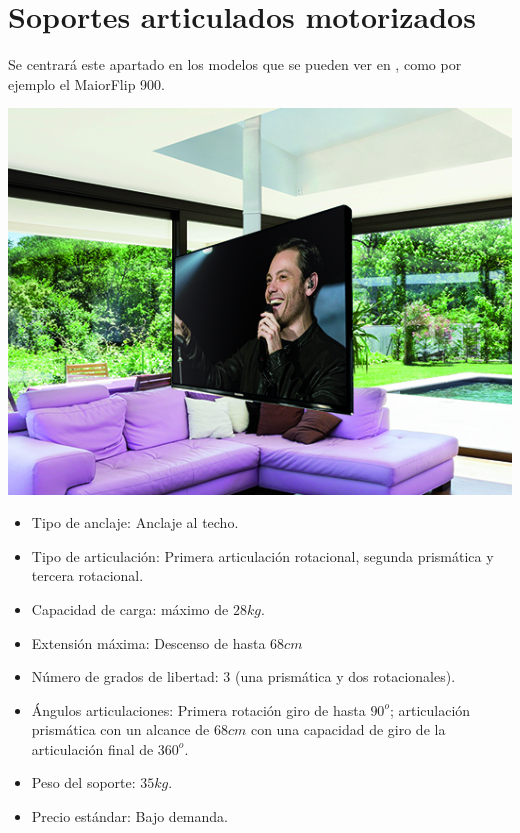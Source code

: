 \section{Soportes articulados motorizados}

Se centrará este apartado en los modelos que se pueden ver en \cite{maiormover:2018}, como por ejemplo el MaiorFlip 900.

\begin{minipage}{0.35\textwidth}
   \includegraphics[width=\linewidth]{figuras/Imagenes_EstadoArte/not_valid_1.jpg}
\end{minipage}
\begin{minipage}{0.65\textwidth}\raggedright
   \hspace{1cm}
   \begin{itemize}
       \item Tipo de anclaje: Anclaje al techo.
       \item Tipo de articulación: Primera articulación rotacional, segunda prismática y tercera rotacional.
       \item Capacidad de carga: máximo de $28kg$.
       \item Extensión máxima: Descenso de hasta $68cm$
       \item Número de grados de libertad: 3 (una prismática y dos rotacionales).
       \item Ángulos articulaciones: Primera rotación giro de hasta $90^o$; articulación prismática con un alcance de $68cm$ con una capacidad de giro de la articulación final de $360^o$.
       \item Peso del soporte: $35kg$.
       \item Precio estándar: Bajo demanda.
   \end{itemize}
\end{minipage}
\\

